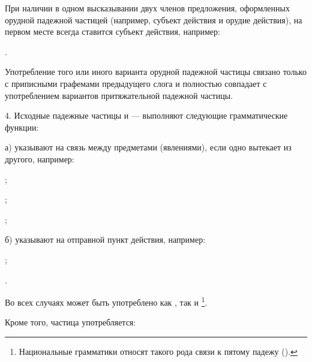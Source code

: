 При наличии в одном высказывании двух членов предложения, оформленных орудной падежной частицей (например, субъект действия и орудие действия), на первом месте всегда ставится субъект действия, например:
\begin{prfsample}
	\item {}.
\end{prfsample}

Употребление того или иного варианта орудной падежной частицы связано только с приписными графемами предыдущего слога и полностью совпадает с употреблением вариантов притяжательной падежной частицы.

4. Исходные падежные частицы  и  --- выполняют следующие грамматические функции:

а) указывают на связь между предметами (явлениями), если одно вытекает из другого, например:
\begin{prfsample}
	\item {};
	\item {};
	\item {};
\end{prfsample}

б) указывают на отправной пункт действия, например:
\begin{prfsample}
	\item {};
	\item {}.
\end{prfsample}

Во всех случаях может быть употреблено как , так и \footnote[48]{Национальные грамматики относят такого рода связи к пятому падежу ().}.

Кроме того, частица  употребляется:

